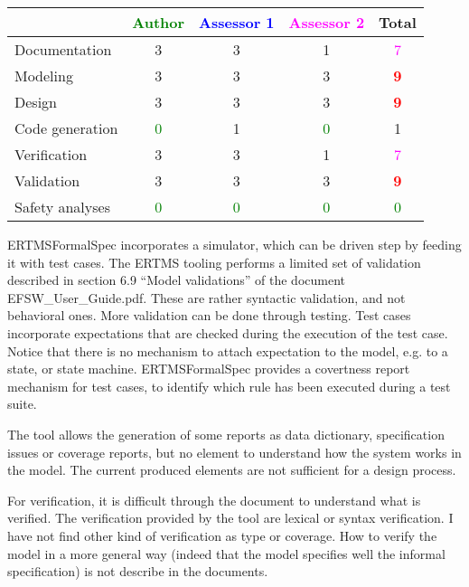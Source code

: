 \begin{tabular}{|l | c | c | c | c|}
\hline
& \textcolor{green}{Author} & \textcolor{blue}{Assessor 1} & \textcolor{magenta}{Assessor 2} & Total \\
\hline 
Documentation & 3     & 3     & 1     & \textcolor{magenta}{7} \\
\hline
Modeling & 3     & 3     & 3     & \textcolor{red}{\textbf{9}} \\
\hline
Design & 3     & 3     & 3     & \textcolor{red}{\textbf{9}} \\
\hline
Code generation & \textcolor{green}{0} & 1     & \textcolor{green}{0} & 1    \\
\hline
Verification & 3     & 3     & 1     & \textcolor{magenta}{7} \\
\hline
Validation & 3     & 3     & 3     & \textcolor{red}{\textbf{9}}  \\
\hline
Safety analyses & \textcolor{green}{0} & \textcolor{green}{0} & \textcolor{green}{0} & \textcolor{green}{0} \\
\hline
\end{tabular}

\begin{assessor1}
ERTMSFormalSpec incorporates a simulator, which can be driven step by feeding it with test cases. 
The ERTMS tooling performs a limited set of validation described in section 6.9 "`Model validations"' of the document EFSW\_User\_Guide.pdf. These are rather syntactic validation, and not behavioral ones. More validation can be done through testing. Test cases incorporate expectations that are checked during the execution of the test case. Notice that there is no mechanism to attach expectation to the model, e.g. to a state, or state machine. ERTMSFormalSpec provides a covertness report mechanism for test cases, to identify which rule has been executed during a test suite. 
\end{assessor1}

\begin{assessor2}
The tool allows the generation of some reports as data dictionary, specification issues or coverage reports, but no element to understand how the system works in the model. The current produced elements are not sufficient for a design process.

For verification, it is difficult through the document to understand what is verified. The verification provided by the tool are lexical or syntax verification. I have not find other kind of verification as type or coverage. How to verify the model in a more general way (indeed that the model specifies well the informal specification) is not describe in the documents.
\end{assessor2}


